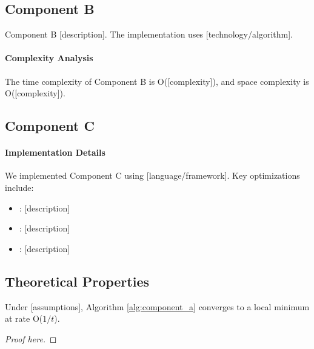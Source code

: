 \subsection{Component B}
\label{sec:component_b}

Component B [description]. The implementation uses [technology/algorithm].

\paragraph{Complexity Analysis}
The time complexity of Component B is O([complexity]), and space complexity is O([complexity]).

\subsection{Component C}
\label{sec:component_c}

\paragraph{Implementation Details}
We implemented Component C using [language/framework].
Key optimizations include:
\begin{itemize}
    \item [Optimization 1]: [description]
    \item [Optimization 2]: [description]
    \item [Optimization 3]: [description]
\end{itemize}

\subsection{Theoretical Properties}

\begin{theorem}
\label{thm:convergence}
Under [assumptions], Algorithm \ref{alg:component_a} converges to a local minimum at rate O($1/t$).
\end{theorem}

\begin{proof}
[Proof here]
\end{proof}
